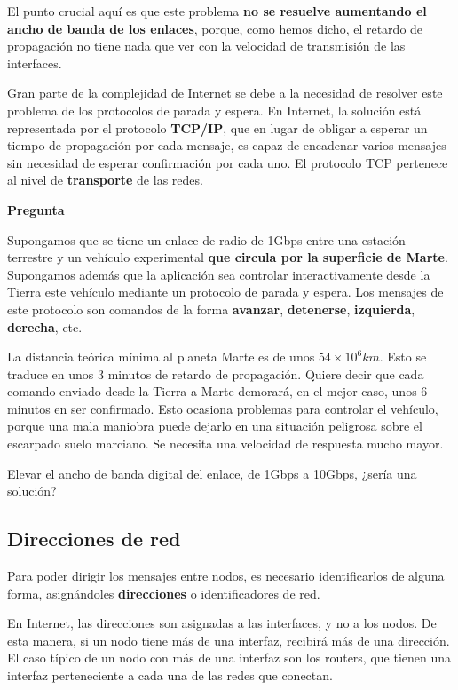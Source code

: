\documentclass[spanish,A4,]{article}
\begin{document}
El punto crucial aquí es que este problema \textbf{no se resuelve
aumentando el ancho de banda de los enlaces}, porque, como hemos dicho,
el retardo de propagación no tiene nada que ver con la velocidad de
transmisión de las interfaces.

Gran parte de la complejidad de Internet se debe a la necesidad de
resolver este problema de los protocolos de parada y espera. En
Internet, la solución está representada por el protocolo
\textbf{TCP/IP}, que en lugar de obligar a esperar un tiempo de
propagación por cada mensaje, es capaz de encadenar varios mensajes sin
necesidad de esperar confirmación por cada uno. El protocolo TCP
pertenece al nivel de \textbf{transporte} de las redes.

\textbf{Pregunta}

Supongamos que se tiene un enlace de radio de 1Gbps entre una estación
terrestre y un vehículo experimental \textbf{que circula por la
superficie de Marte}. Supongamos además que la aplicación sea controlar
interactivamente desde la Tierra este vehículo mediante un protocolo de
parada y espera. Los mensajes de este protocolo son comandos de la forma
\textbf{avanzar}, \textbf{detenerse}, \textbf{izquierda},
\textbf{derecha}, etc.

La distancia teórica mínima al planeta Marte es de unos
$54 \times 10^6 km$. Esto se traduce en unos 3 minutos de retardo de
propagación. Quiere decir que cada comando enviado desde la Tierra a
Marte demorará, en el mejor caso, unos 6 minutos en ser confirmado. Esto
ocasiona problemas para controlar el vehículo, porque una mala maniobra
puede dejarlo en una situación peligrosa sobre el escarpado suelo
marciano. Se necesita una velocidad de respuesta mucho mayor.

Elevar el ancho de banda digital del enlace, de 1Gbps a 10Gbps, ¿sería
una solución?

\subsection{Direcciones de red}\label{direcciones-de-red}

Para poder dirigir los mensajes entre nodos, es necesario identificarlos
de alguna forma, asignándoles \textbf{direcciones} o identificadores de
red.

En Internet, las direcciones son asignadas a las interfaces, y no a los
nodos. De esta manera, si un nodo tiene más de una interfaz, recibirá
más de una dirección. El caso típico de un nodo con más de una interfaz
son los routers, que tienen una interfaz perteneciente a cada una de las
redes que conectan.
\end{document}
